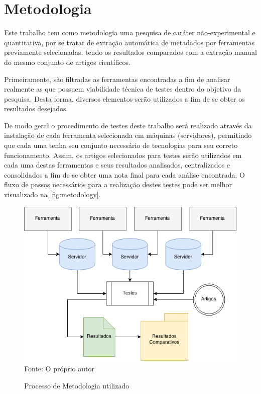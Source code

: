 
\chapter{Metodologia}
\label{cha:metodology}

Este trabalho tem como metodologia uma pesquisa de caráter não-experimental e quantitativa, por se tratar de extração automática de metadados por ferramentas previamente selecionadas, tendo os resultados comparados com a extração manual do mesmo conjunto de artigos científicos.


Primeiramente, são filtradas as ferramentas encontradas a fim de analisar realmente as que possuem viabilidade técnica de testes dentro do objetivo da pesquisa. Desta forma, diversos elementos serão utilizados a fim de se obter os resultados desejados.


De modo geral o procedimento de testes deste trabalho será realizado através da instalação de cada ferramenta selecionada em máquinas (servidores), permitindo que cada uma tenha seu conjunto necessário de tecnologias para seu correto funcionamento. Assim, os artigos selecionados para testes serão utilizados em cada uma destas ferramentas e seus resultados analisados, centralizados e consolidados a fim de se obter uma nota final para cada análise encontrada. O fluxo de passos necessários para a realização destes testes pode ser melhor visualizado na \autoref{fig:metodology}.

\begin{figure}
    \centering
    \caption{Processo de Metodologia utilizado}
    \label{fig:metodology}
    \includegraphics[width=0.8\linewidth]{./assets/images/metodology}
    \center\footnotesize{Fonte: O próprio autor}
\end{figure}



